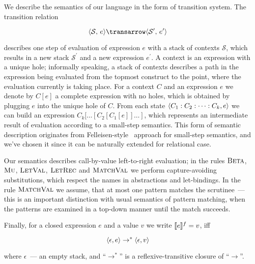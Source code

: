 We describe the semantics of our language in the form of transition system. The transition relation

\setarrow{\to}
\newcommand{\step}[2]{\trans{\inbr{#1}}{}{\inbr{#2}}}

$$
\step{\mathcal S,\,e}{\mathcal S^\prime,\,e^\prime}
$$

\noindent describes one step of evaluation of expression $e$ with a stack of contexts $\mathcal S$, which results in
a new stack $\mathcal S^\prime$ and a new expression $e^\prime$. A context is an expression with a unique hole; informally speaking, 
a stack of contexts describes a path in the expression being evaluated from the topmost construct to the point, where the evaluation 
currently is taking place. For a context $C$ and an expression $e$ we denote by $C[e]$ a complete expression with no holes, which is 
obtained by plugging $e$ into the unique hole of $C$. From each state $\left<{C_1:C_2:\dots:C_k,e}\right>$ we can build an 
expression $C_k[\dots[C_2[C_1[e]]\dots]$, which represents an intermediate result of evaluation according to a small-step semantics. 
This form of semantic description originates from Felleisen-style~\cite{Felleisen} approach for small-step semantics, and we've
chosen it since it can be naturally extended for relational case.

Our semantics describes call-by-value left-to-right evaluation; in the rules $\textsc{Beta}$, $\textsc{Mu}$, $\textsc{LetVal}$,
$\textsc{LetRec}$ and $\textsc{MatchVal}$ we perform capture-avoiding substitutions, which respect the names in abstractions and let-bindings.
In the rule $\textsc{MatchVal}$ we assume, that at most one pattern matches the scrutinee~--- this is an important distinction with usual 
semantics of pattern matching, when the patterns are examined in a top-down manner until the match succeeds.

Finally, for a closed expression $e$ and a value $v$ we write $\llbracket{e}\rrbracket^f=v$, iff 

$$\left<{\epsilon,e}\right>\to^*\left<{\epsilon,v}\right>$$

\noindent where $\epsilon$~--- an empty stack, and ``$\to^*$'' is a reflexive-transitive closure of ``$\to$''.

